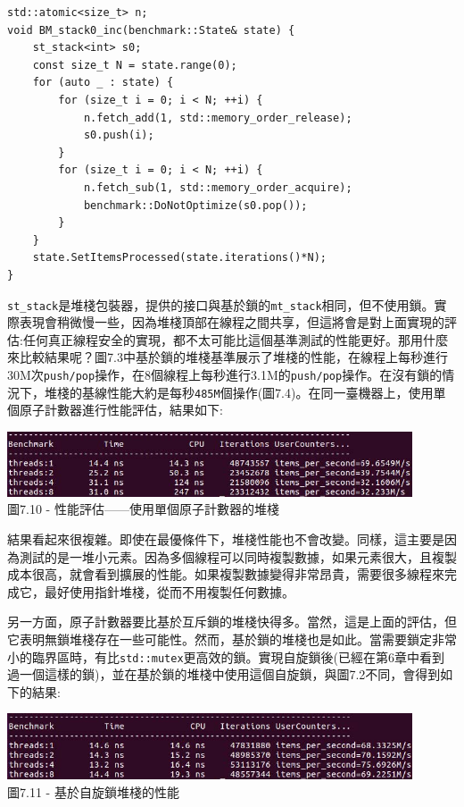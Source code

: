 \begin{lstlisting}[style=styleCXX]
std::atomic<size_t> n;
void BM_stack0_inc(benchmark::State& state) {
	st_stack<int> s0;
	const size_t N = state.range(0);
	for (auto _ : state) {
		for (size_t i = 0; i < N; ++i) {
			n.fetch_add(1, std::memory_order_release);
			s0.push(i);
		}
		for (size_t i = 0; i < N; ++i) {
			n.fetch_sub(1, std::memory_order_acquire);
			benchmark::DoNotOptimize(s0.pop());
		}
	}
	state.SetItemsProcessed(state.iterations()*N);
}
\end{lstlisting}

\texttt{st\_stack}是堆棧包裝器，提供的接口與基於鎖的\texttt{mt\_stack}相同，但不使用鎖。實際表現會稍微慢一些，因為堆棧頂部在線程之間共享，但這將會是對上面實現的評估:任何真正線程安全的實現，都不太可能比這個基準測試的性能更好。那用什麼來比較結果呢？圖7.3中基於鎖的堆棧基準展示了堆棧的性能，在線程上每秒進行30M次\texttt{push/pop}操作，在8個線程上每秒進行3.1M的\texttt{push/pop}操作。在沒有鎖的情況下，堆棧的基線性能大約是每秒\texttt{485M}個操作(圖7.4)。在同一臺機器上，使用單個原子計數器進行性能評估，結果如下:

\begin{center}
\includegraphics[width=0.9\textwidth]{content/2/chapter7/images/10.jpg}\\
圖7.10 - 性能評估——使用單個原子計數器的堆棧
\end{center}

結果看起來很複雜。即使在最優條件下，堆棧性能也不會改變。同樣，這主要是因為測試的是一堆小元素。因為多個線程可以同時複製數據，如果元素很大，且複製成本很高，就會看到擴展的性能。如果複製數據變得非常昂貴，需要很多線程來完成它，最好使用指針堆棧，從而不用複製任何數據。

另一方面，原子計數器要比基於互斥鎖的堆棧快得多。當然，這是上面的評估，但它表明無鎖堆棧存在一些可能性。然而，基於鎖的堆棧也是如此。當需要鎖定非常小的臨界區時，有比\texttt{std::mutex}更高效的鎖。實現自旋鎖後(已經在第6章中看到過一個這樣的鎖)，並在基於鎖的堆棧中使用這個自旋鎖，與圖7.2不同，會得到如下的結果:

\begin{center}
\includegraphics[width=0.9\textwidth]{content/2/chapter7/images/11.jpg}\\
圖7.11 - 基於自旋鎖堆棧的性能
\end{center}

